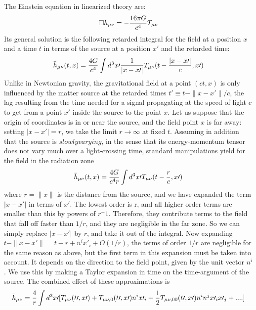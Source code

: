 \documentclass[binding=0.6cm, LaM]{sapthesis}
\begin{document}
The Einstein equation in linearized theory are:
\begin{equation}
\square {\bar h_{\mu\nu}} = - {{16 \pi G}\over c^4} T_{\mu\nu}
\end{equation}
Its general solution is the following retarded integral for the field at a position $x$ and a time $t$ in terms of the source at a position $x\prime$ and the retarded time:
\begin{equation}
 {\bar h_{\mu\nu}} (t, x) = {{4G}\over c^4} \int d^3x\prime {1 \over {|x-x\prime|}} T_{\mu\nu}(t-{{|x-x\prime|}\over c}, x\prime)
\end{equation}
Unlike in Newtonian gravity, the gravitational field at a point $(ct,x)$ is only influenced by the matter source at the retarded times $t\prime \equiv t−\|x-x\prime\|/c$, the lag resulting from the time needed for a signal propagating at the speed of light $c$ to get from a point $x\prime$ inside the source to the point $x$. 
Let us suppose that the origin of coordinates is in or near the source, and the field point $x$ is far away: setting $|x-x\prime|= r$, we take the limit $r \longrightarrow \infty$ at fixed $t$. 
Assuming in addition that the source is $slowly varying$, in the sense that its energy-momentum tensor does not vary much over a light-crossing time, standard manipulations yield for the field in the radiation zone
\begin{equation}
{\bar h_{\mu\nu}} (t, x) = {{4G}\over {c^4r}} \int d^3x\prime  T_{\mu\nu}(t-{r\over c}, x\prime)
\end{equation}
where $r = \|x\|$ is the distance from the source, and we have expanded the term $|x-x\prime|$ in terms of $x\prime$. The lowest order is r, and all higher order terms are smaller than this by powers of $r^-1$. Therefore, they contribute terms to the field that fall  off faster than $1/r$, and they are negligible in the far zone. So we can simply replace $|x-x\prime|$ by $r$, and take it out of the integral. 
Now expanding $t−\|x-x\prime\| = t - r + n^i x\prime_i + O(1/r)$, the terms of order $1/r$ are negligible for the same reason as above, but the first term in this expansion must be taken into account. It depends on the direction to the field point, given by the unit vector $n^i$. We use this by making a Taylor expansion in time on the time-argument of the source. The combined effect of these approximations is 
\begin{equation}
{\bar h_{\mu\nu}} = {4 \over r} \int {d^3x\prime [T_{\mu\nu}(t\prime, x\prime) + T_{\mu\nu,0}(t\prime,x\prime)n^ix\prime_i + {1\over2}T_{\mu\nu,00}(t\prime,x\prime)n^in^jx\prime_i x\prime_j + ....]}
\end{equation}
\end{document}
